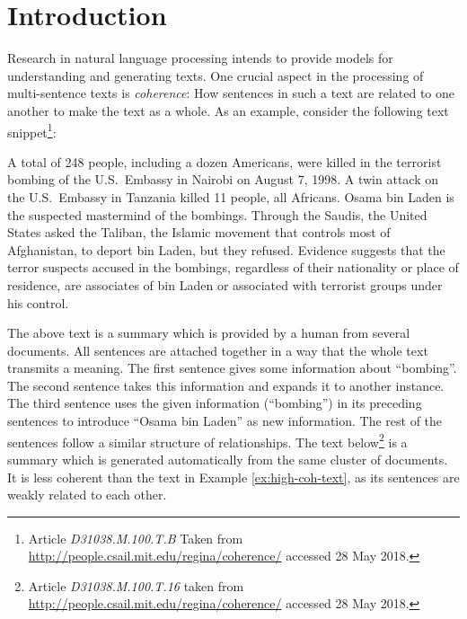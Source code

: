
\chapter{Introduction}
\label{ch:intro}

Research in natural language processing intends to provide models for understanding and generating texts.   
One crucial aspect in the processing of multi-sentence texts is \emph{coherence}: How sentences in such a text are related to one another to make the text as a whole. 
As an example, consider the following text snippet\footnote{Article \emph{D31038.M.100.T.B} Taken from \url{http://people.csail.mit.edu/regina/coherence/} accessed 28 May 2018. 
}:

\begin{examples}
\label{ex:high-coh-text}
A total of 248 people, including a dozen Americans, were killed in the terrorist bombing of the U.S.\ Embassy in Nairobi on August 7, 1998. 
A twin attack on the U.S.\ Embassy in Tanzania killed 11 people, all Africans. 
Osama bin Laden is the suspected mastermind of the bombings. 
Through the Saudis, the United States asked the Taliban, the Islamic movement that controls most of Afghanistan, to deport bin Laden, but they refused. 
Evidence suggests that the terror suspects accused in the bombings, regardless of their nationality or place of residence, are associates of bin Laden or associated with terrorist groups under his control.
\end{examples}

The above text is a summary which is provided by a human from several documents. 
All sentences are attached together in a way that the whole text transmits a meaning. 
The first sentence gives some information about ``bombing''. 
The second sentence takes this information and expands it to another instance. 
The third sentence uses the given information (``bombing'') in its preceding sentences to introduce ``Osama bin Laden'' as new information. 
The rest of the sentences follow a similar structure of relationships.  
The text below\footnote{Article \emph{D31038.M.100.T.16} taken from 
\url{http://people.csail.mit.edu/regina/coherence/}
accessed 28 May 2018.} is a summary which is generated automatically from the same cluster of documents. 
It is less coherent than the text in Example \ref{ex:high-coh-text}, as its sentences are weakly related to each other. 

